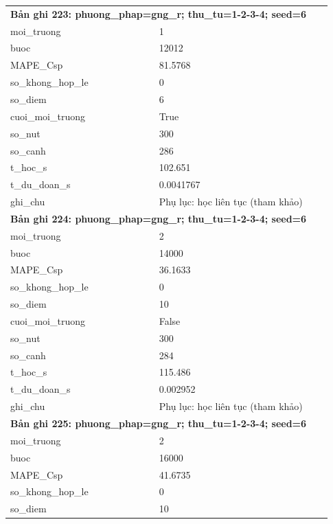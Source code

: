 \begin{longtable}{p{0.43\linewidth}p{0.50\linewidth}}
\midrule
\multicolumn{2}{p{0.95\linewidth}}{\textbf{Bản ghi 223: phuong\_phap=gng\_r; thu\_tu=1-2-3-4; seed=6}} \\
moi\_\allowbreak truong & 1 \\
buoc & 12012 \\
MAPE\_\allowbreak Csp & 81.5768 \\
so\_\allowbreak khong\_\allowbreak hop\_\allowbreak le & 0 \\
so\_\allowbreak diem & 6 \\
cuoi\_\allowbreak moi\_\allowbreak truong & True \\
so\_\allowbreak nut & 300 \\
so\_\allowbreak canh & 286 \\
t\_\allowbreak hoc\_\allowbreak s & 102.651 \\
t\_\allowbreak du\_\allowbreak doan\_\allowbreak s & 0.0041767 \\
ghi\_\allowbreak chu & Phụ lục: học liên tục (tham khảo) \\
\midrule
\multicolumn{2}{p{0.95\linewidth}}{\textbf{Bản ghi 224: phuong\_phap=gng\_r; thu\_tu=1-2-3-4; seed=6}} \\
moi\_\allowbreak truong & 2 \\
buoc & 14000 \\
MAPE\_\allowbreak Csp & 36.1633 \\
so\_\allowbreak khong\_\allowbreak hop\_\allowbreak le & 0 \\
so\_\allowbreak diem & 10 \\
cuoi\_\allowbreak moi\_\allowbreak truong & False \\
so\_\allowbreak nut & 300 \\
so\_\allowbreak canh & 284 \\
t\_\allowbreak hoc\_\allowbreak s & 115.486 \\
t\_\allowbreak du\_\allowbreak doan\_\allowbreak s & 0.002952 \\
ghi\_\allowbreak chu & Phụ lục: học liên tục (tham khảo) \\
\midrule
\multicolumn{2}{p{0.95\linewidth}}{\textbf{Bản ghi 225: phuong\_phap=gng\_r; thu\_tu=1-2-3-4; seed=6}} \\
moi\_\allowbreak truong & 2 \\
buoc & 16000 \\
MAPE\_\allowbreak Csp & 41.6735 \\
so\_\allowbreak khong\_\allowbreak hop\_\allowbreak le & 0 \\
so\_\allowbreak diem & 10 \\

\end{longtable}
